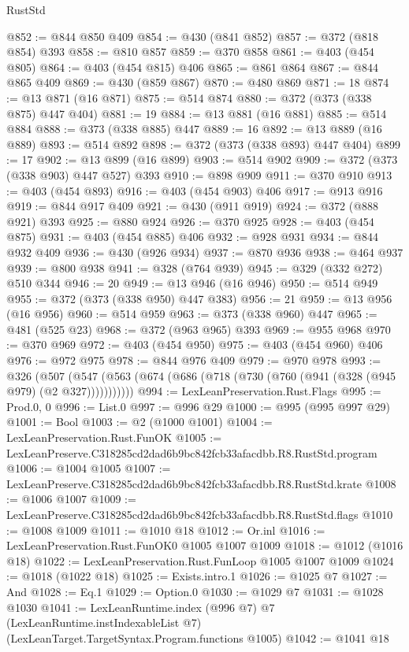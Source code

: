 \begin{lexlean}{RustStd}
\begin{coremodule}
@852 := @844 @850 @409
@854 := @430 (@841 @852)
@857 := @372 (@818 @854) @393
@858 := @810 @857
@859 := @370 @858
@861 := @403 (@454 @805)
@864 := @403 (@454 @815) @406
@865 := @861 @864
@867 := @844 @865 @409
@869 := @430 (@859 @867)
@870 := @480 @869
@871 := 18
@874 := @13 @871 (@16 @871)
@875 := @514 @874
@880 := @372 (@373 (@338 @875) @447 @404)
@881 := 19
@884 := @13 @881 (@16 @881)
@885 := @514 @884
@888 := @373 (@338 @885) @447
@889 := 16
@892 := @13 @889 (@16 @889)
@893 := @514 @892
@898 := @372 (@373 (@338 @893) @447 @404)
@899 := 17
@902 := @13 @899 (@16 @899)
@903 := @514 @902
@909 := @372 (@373 (@338 @903) @447 @527) @393
@910 := @898 @909
@911 := @370 @910
@913 := @403 (@454 @893)
@916 := @403 (@454 @903) @406
@917 := @913 @916
@919 := @844 @917 @409
@921 := @430 (@911 @919)
@924 := @372 (@888 @921) @393
@925 := @880 @924
@926 := @370 @925
@928 := @403 (@454 @875)
@931 := @403 (@454 @885) @406
@932 := @928 @931
@934 := @844 @932 @409
@936 := @430 (@926 @934)
@937 := @870 @936
@938 := @464 @937
@939 := @800 @938
@941 := @328 (@764 @939)
@945 := @329 (@332 @272) @510 @344
@946 := 20
@949 := @13 @946 (@16 @946)
@950 := @514 @949
@955 := @372 (@373 (@338 @950) @447 @383)
@956 := 21
@959 := @13 @956 (@16 @956)
@960 := @514 @959
@963 := @373 (@338 @960) @447
@965 := @481 (@525 @23)
@968 := @372 (@963 @965) @393
@969 := @955 @968
@970 := @370 @969
@972 := @403 (@454 @950)
@975 := @403 (@454 @960) @406
@976 := @972 @975
@978 := @844 @976 @409
@979 := @970 @978
@993 := @326
    (@507 (@547 (@563 (@674 (@686 (@718 (@730 (@760 (@941 (@328 (@945 @979) (@2 @327)))))))))))
@994 := LexLeanPreservation.Rust.Flags
@995 := Prod.{0, 0}
@996 := List.{0}
@997 := @996 @29
@1000 := @995 (@995 @997 @29)
@1001 := Bool
@1003 := @2 (@1000 @1001)
@1004 := LexLeanPreservation.Rust.FunOK
@1005 := LexLeanPreserve.C318285cd2dad6b9bc842fcb33afacdbb.R8.RustStd.program
@1006 := @1004 @1005
@1007 := LexLeanPreserve.C318285cd2dad6b9bc842fcb33afacdbb.R8.RustStd.krate
@1008 := @1006 @1007
@1009 := LexLeanPreserve.C318285cd2dad6b9bc842fcb33afacdbb.R8.RustStd.flags
@1010 := @1008 @1009
@1011 := @1010 @18
@1012 := Or.inl
@1016 := LexLeanPreservation.Rust.FunOK0 @1005 @1007 @1009
@1018 := @1012 (@1016 @18)
@1022 := LexLeanPreservation.Rust.FunLoop @1005 @1007 @1009
@1024 := @1018 (@1022 @18)
@1025 := Exists.intro.{1}
@1026 := @1025 @7
@1027 := And
@1028 := Eq.{1}
@1029 := Option.{0}
@1030 := @1029 @7
@1031 := @1028 @1030
@1041 := LexLeanRuntime.index
    (@996 @7)
    @7
    (LexLeanRuntime.instIndexableList @7)
    (LexLeanTarget.TargetSyntax.Program.functions @1005)
@1042 := @1041 @18

\end{coremodule}
\end{lexlean}

